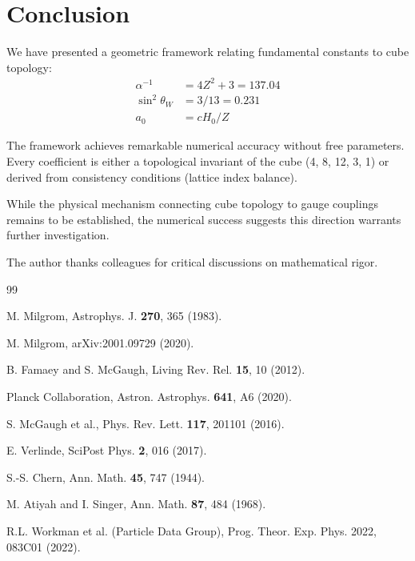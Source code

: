 \documentclass[twocolumn,showpacs,preprintnumbers,amsmath,amssymb,prd]{revtex4-2}
\begin{document}
\section{Conclusion}

We have presented a geometric framework relating fundamental constants to cube topology:
\begin{align}
\alpha^{-1} &= 4Z^2 + 3 = 137.04 \nonumber\\
\sin^2\theta_W &= 3/13 = 0.231 \nonumber\\
a_0 &= cH_0/Z
\end{align}

The framework achieves remarkable numerical accuracy without free parameters. Every coefficient is either a topological invariant of the cube (4, 8, 12, 3, 1) or derived from consistency conditions (lattice index balance).

While the physical mechanism connecting cube topology to gauge couplings remains to be established, the numerical success suggests this direction warrants further investigation.

\begin{acknowledgments}
The author thanks colleagues for critical discussions on mathematical rigor.
\end{acknowledgments}

\begin{thebibliography}{99}

 M. Milgrom, Astrophys. J. \textbf{270}, 365 (1983).

 M. Milgrom, arXiv:2001.09729 (2020).

 B. Famaey and S. McGaugh, Living Rev. Rel. \textbf{15}, 10 (2012).

 Planck Collaboration, Astron. Astrophys. \textbf{641}, A6 (2020).

 S. McGaugh et al., Phys. Rev. Lett. \textbf{117}, 201101 (2016).

 E. Verlinde, SciPost Phys. \textbf{2}, 016 (2017).

 S.-S. Chern, Ann. Math. \textbf{45}, 747 (1944).

 M. Atiyah and I. Singer, Ann. Math. \textbf{87}, 484 (1968).

 R.L. Workman et al. (Particle Data Group), Prog. Theor. Exp. Phys. 2022, 083C01 (2022).

\end{thebibliography}
\end{document}
